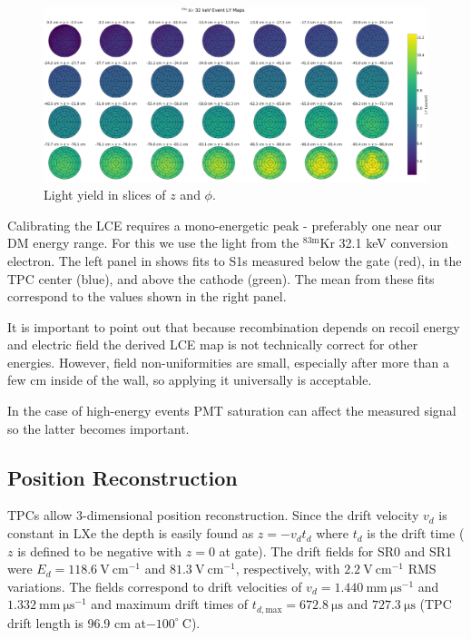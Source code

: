 \begin{figure}
\centering
\includegraphics[width=\textwidth]{LCEMapPolar}
\caption{Light yield in slices of $z$ and $\phi$.}
\label{fig:calibrations_lce_polar}
\end{figure}

Calibrating the LCE requires a mono-energetic peak - preferably one near our DM energy range.  For this we use the light from the
$\mathrm{^{83m}Kr}$ 32.1 keV conversion electron.  The left panel in  shows fits to S1s measured below the gate
(red), in the TPC center (blue), and above the cathode (green).  The mean from these fits correspond to the values shown in the right
panel.

It is important to point out that because recombination depends on recoil energy and electric field the derived LCE map is not
technically correct for other energies.  However, field non-uniformities are small, especially after more than a few cm inside of the
wall, so applying it universally is acceptable.

In the case of high-energy events PMT saturation can
affect the measured signal so the latter becomes important.



\subsection{Position Reconstruction}
\label{subsec:det_char_position_reconstruction}
TPCs allow 3-dimensional position reconstruction.  Since the drift velocity $v_d$
is constant in LXe the depth is easily found as $z = -v_d t_d$ where $t_d$ is the drift time ($z$ is defined to be negative with
$z = 0$ at gate).  The drift fields for SR0 and SR1 were $E_d = 118.6\ \mathrm{V\ cm^{-1}}$ and $81.3\ \mathrm{V\ cm^{-1}}$,
respectively, with $2.2\ \mathrm{V\ cm^{-1}}$ RMS variations.  The fields correspond to drift velocities of
$v_d = 1.440\ \mathrm{mm\ \mu s^{-1}}$ and $1.332\ \mathrm{mm\ \mu s^{-1}}$ and
maximum drift times of $t_{d, \mathrm{max}} = 672.8\ \mathrm{\mu s}$ and $727.3\ \mathrm{\mu s}$ (TPC drift length is 96.9
cm at$-100^{\circ}\ \mathrm{C}$).

